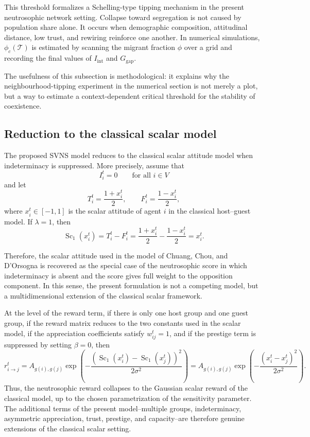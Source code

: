 \documentclass[11pt,a4paper]{article}
\begin{document}
This threshold formalizes a Schelling-type tipping mechanism in the present
neutrosophic network setting. Collapse toward segregation is not caused by
population share alone. It occurs when demographic composition, attitudinal
distance, low trust, and rewiring reinforce one another. In numerical simulations,
$\phi_c(\mathcal T)$ is estimated by scanning the migrant fraction $\phi$ over a
grid and recording the final values of $I_{\mathrm{int}}$ and
$G_{\mathrm{gap}}$.

The usefulness of this subsection is methodological: it explains why the
neighbourhood-tipping experiment in the numerical section is not merely a plot,
but a way to estimate a context-dependent critical threshold for the stability of
coexistence.

\subsection{Reduction to the classical scalar model}

The proposed SVNS model reduces to the classical scalar attitude model when
indeterminacy is suppressed. More precisely, assume that
\[
I_i^t=0
\qquad\text{for all }i\in V
\]
and let
\[
T_i^t=\frac{1+x_i^t}{2},
\qquad
F_i^t=\frac{1-x_i^t}{2},
\]
where $x_i^t\in[-1,1]$ is the scalar attitude of agent $i$ in the classical
host--guest model. If $\lambda=1$, then
\[
\operatorname{Sc}_{1}(x_i^t)
=
T_i^t-F_i^t
=
\frac{1+x_i^t}{2}
-
\frac{1-x_i^t}{2}
=
x_i^t.
\]

Therefore, the scalar attitude used in the model of Chuang, Chou, and D'Orsogna
is recovered as the special case of the neutrosophic score in which
indeterminacy is absent and the score gives full weight to the opposition
component. In this sense, the present formulation is not a competing model, but a
multidimensional extension of the classical scalar framework.

At the level of the reward term, if there is only one host group and one guest
group, if the reward matrix reduces to the two constants used in the scalar
model, if the appreciation coefficients satisfy $w_{ij}^t=1$, and if the
prestige term is suppressed by setting $\beta=0$, then
\[
r_{i\to j}^t
=
A_{g(i),g(j)}
\exp\left(
-\frac{
	\left(
	\operatorname{Sc}_{1}(x_i^t)
	-
	\operatorname{Sc}_{1}(x_j^t)
	\right)^2
}{2\sigma^2}
\right)
=
A_{g(i),g(j)}
\exp\left(
-\frac{(x_i^t-x_j^t)^2}{2\sigma^2}
\right).
\]
Thus, the neutrosophic reward collapses to the Gaussian scalar reward of the
classical model, up to the chosen parametrization of the sensitivity parameter.
The additional terms of the present model--multiple groups, indeterminacy,
asymmetric appreciation, trust, prestige, and capacity--are therefore genuine
extensions of the classical scalar setting.
\end{document}
